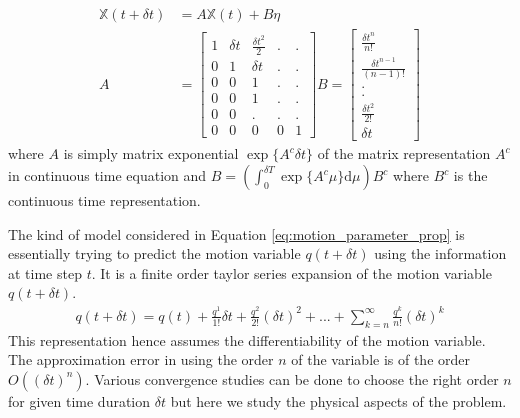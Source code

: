 \documentclass[conference]{IEEEtran}
\begin{document}
\begin{align}
\mathbb{X}(t+\delta t)& = A \mathbb{X}(t) + B \eta\\
A& = 
\begin{bmatrix}
 1 & \delta  t & \frac{{\delta  t}^2}{2} &  . & . \\
0 & 1 & \delta  t &  . & . \\
0 & 0 & 1  &  . & . \\
0 & 0 & 1  &  . & . \\
0 & 0 & .  &  . & . \\
0&  0&    0 &     0 &    1
\end{bmatrix}
B = 
\begin{bmatrix}
\frac{{\delta t}^n}{n!}\\
\frac{{\delta t}^{n-1}}{(n-1)!}\\
.\\
.\\
\frac{{\delta t}^2}{2!}\\
\delta t
\end{bmatrix}\label{eq:motion_parameter_prop}
\end{align}
where $A$ is simply matrix exponential $\exp\{A^c\delta t\}$ of the matrix representation $A^c$  in continuous time equation and $B = (\int_0^{\delta T}\exp\{A^c\mu\}\mathrm{d}\mu) B^c $ where $B^c$ is the continuous time representation. 

The kind of model considered in Equation \ref{eq:motion_parameter_prop} is essentially trying to predict the motion variable $q(t+\delta t)$ using the information at time step $t$. It is a finite order taylor series expansion of the motion variable $q(t+\delta t)$. 
\begin{align}
q(t+\delta t) = q(t) + \frac{q^1}{1!}\delta t + \frac{q^2}{2!}(\delta t)^2 + . . . +\sum_{k=n}^{\infty} \frac{q^k}{n!}(\delta t)^k \label{eq:taylor_approx}
\end{align} 
This representation hence assumes the differentiability of the motion variable. The approximation error in using the order $n$ of the variable is of the order $O((\delta t)^n)$. Various convergence studies can be done to choose the right order $n$ for given time duration $\delta t$ but here we study the physical aspects of the problem.
\end{document}
